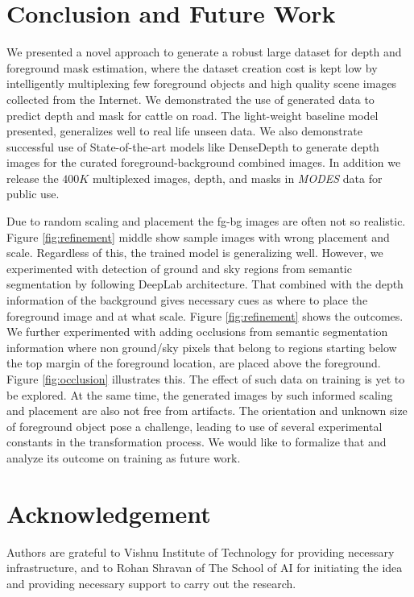 \documentclass[review]{cvpr}
\begin{document}
\section{Conclusion and Future Work}

We presented a novel approach to generate a robust large dataset for depth and foreground mask estimation, where the dataset creation cost is kept low by intelligently multiplexing few foreground objects and high quality scene images collected from the Internet. We demonstrated the use of generated data to predict depth and mask for cattle on road. The light-weight baseline model presented, generalizes well to real life unseen data.  We also demonstrate successful use of State-of-the-art models like DenseDepth to generate depth images for the curated foreground-background combined images. In addition we release the $400K$ multiplexed images, depth, and masks in \textit{MODES} data for public use.

Due to random scaling and placement the fg-bg images are often not so realistic. Figure \ref{fig:refinement} middle show sample images with wrong placement and scale. Regardless of this, the trained model is generalizing well. However, we experimented with detection of ground and sky regions from semantic segmentation by following DeepLab architecture\cite{deeplabv3plus2018}. That combined with the depth information of the background gives necessary cues as where to place the foreground image and at what scale. Figure \ref{fig:refinement} shows the outcomes. We further experimented with adding occlusions from semantic segmentation information where non ground/sky pixels that belong to regions starting below the top margin of the foreground location, are placed above the foreground. Figure \ref{fig:occlusion} illustrates this. The effect of such data on training is yet to be explored. At the same time, the generated images by such informed scaling and placement are also not free from artifacts. The orientation and unknown size of foreground object pose a challenge, leading to use of several experimental constants in the transformation process. We would like to formalize that and analyze its outcome on training as future work.

\section{Acknowledgement}
Authors are grateful to Vishnu Institute of Technology for providing necessary infrastructure, and to Rohan Shravan of The School of AI for initiating the idea and providing necessary support to carry out the research.

{\small


}
\end{document}
